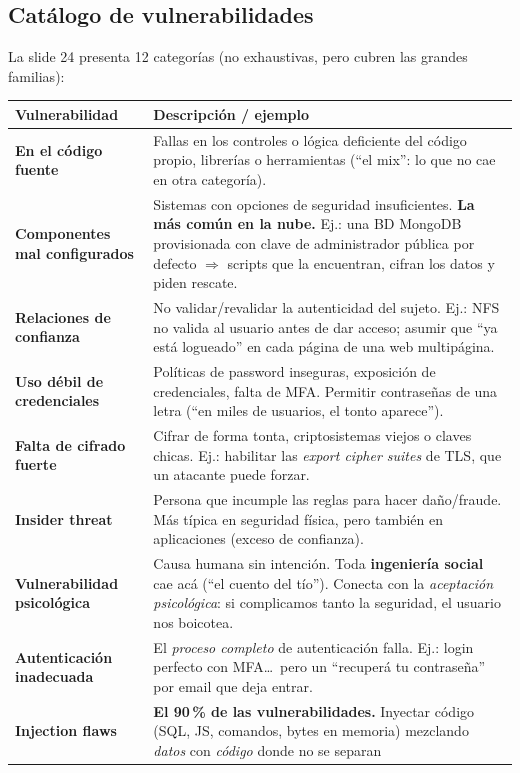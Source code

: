 \documentclass[11pt,a4paper]{article}
\begin{document}
\subsection{Catálogo de vulnerabilidades}
La slide 24 presenta 12 categorías (no exhaustivas, pero cubren las grandes familias):

\begin{center}
\renewcommand{\arraystretch}{1.22}
\begin{tabular}{>{\bfseries}p{4.2cm} p{9.6cm}}
\toprule
Vulnerabilidad & Descripción / ejemplo \\
\midrule
En el código fuente & Fallas en los controles o lógica deficiente del código propio,
  librerías o herramientas (``el mix'': lo que no cae en otra categoría).\\
Componentes mal configurados & Sistemas con opciones de seguridad insuficientes. \textbf{La más
  común en la nube.} Ej.: una BD MongoDB provisionada con clave de administrador pública por
  defecto $\Rightarrow$ scripts que la encuentran, cifran los datos y piden rescate.\\
Relaciones de confianza & No validar/revalidar la autenticidad del sujeto. Ej.: NFS no valida
  al usuario antes de dar acceso; asumir que ``ya está logueado'' en cada página de una web
  multipágina.\\
Uso débil de credenciales & Políticas de password inseguras, exposición de credenciales, falta
  de MFA. Permitir contraseñas de una letra (``en miles de usuarios, el tonto aparece'').\\
Falta de cifrado fuerte & Cifrar de forma tonta, criptosistemas viejos o claves chicas. Ej.:
  habilitar las \emph{export cipher suites} de TLS, que un atacante puede forzar.\\
Insider threat & Persona que incumple las reglas para hacer daño/fraude. Más típica en
  seguridad física, pero también en aplicaciones (exceso de confianza).\\
Vulnerabilidad psicológica & Causa humana sin intención. Toda \textbf{ingeniería social} cae
  acá (``el cuento del tío''). Conecta con la \emph{aceptación psicológica}: si complicamos
  tanto la seguridad, el usuario nos boicotea.\\
Autenticación inadecuada & El \emph{proceso completo} de autenticación falla. Ej.: login
  perfecto con MFA\dots\ pero un ``recuperá tu contraseña'' por email que deja entrar.\\
Injection flaws & \textbf{El 90\,\% de las vulnerabilidades.} Inyectar código (SQL, JS,
  comandos, bytes en memoria) mezclando \emph{datos} con \emph{código} donde no se separan

\end{tabular}
\end{center}
\end{document}
